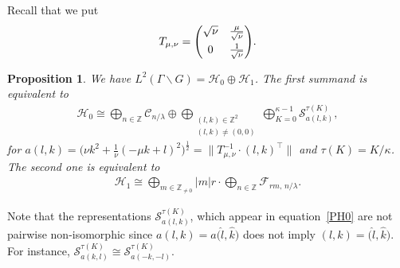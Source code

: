 \documentclass[10pt,a4paper]{amsart}
\newcommand\Z{{\mathbb Z}}
\newcommand\cC{{\mathcal C}}
\newcommand\cH{{\mathcal H}}
\newcommand\cF{{\mathcal F}}
\numberwithin{equation}{section}
\newtheorem{Proposition}[Theorem]{Proposition}
 { \theoremstyle{definition}
\newtheorem{Definition}[Theorem]{Definition}
\newtheorem{Note}[Theorem]{Note}
\newtheorem{Example}[Theorem]{Example}
\newtheorem{Remark}[Theorem]{Remark} }
\begin{document}
Recall that we put
\begin{gather}\label{Tmunu2}
T_{\mu,\nu}=\begin{pmatrix} \sqrt\nu&\frac{\mu}{\sqrt\nu}\vspace{1mm}\\0&\frac 1{\sqrt\nu} \end{pmatrix}\!.
\end{gather}


\begin{Proposition} \label{PH0H1}We have $L^2(\Gamma\backslash G)=\cH_0 \oplus \cH_1$. The first summand is equivalent to
\begin{gather}
\cH_0\cong\bigoplus_{n\in\Z} \cC_{n/\lambda} \oplus \bigoplus _{\substack{(l,k)\in\Z^2\\(l,k)\not=(0,0)}} \bigoplus_{K=0}^{\kappa-1} {\mathcal S}_{a(l,k)}^{\tau(K)}, \label{PH0}
\end{gather}
for $a(l,k)= \big(\nu k^2 +\frac1\nu(-\mu k+l)^2\big)^{\frac12}=\big\|T_{\mu,\nu}^{-1}\cdot(l,k)^\top\big\|$ and $\tau(K)=K/\kappa$.
The second one is equivalent to
\begin{gather}
\cH_1\cong\bigoplus_{m\in \Z_{\not=0}} |m|r\cdot \bigoplus_{n\in\Z} \cF_{rm,\,n/\lambda}. \label{PH1}
\end{gather}
\end{Proposition}

\begin{Remark}\label{R73}
Note that the representations ${\mathcal S}_{a(l,k)}^{\tau(K)}$, which appear in equation~\eqref{PH0} are not pairwise non-isomorphic since $a(l,k)=a\big(\hat l,\hat k\big)$ does not imply $(l,k)=\big(\hat l,\hat k\big)$. For instance,
${\mathcal S}_{a(k,l)}^{\tau(K)}\cong {\mathcal S}_{a(-k,-l)}^{\tau(K)}$.
\end{Remark}
\end{document}
